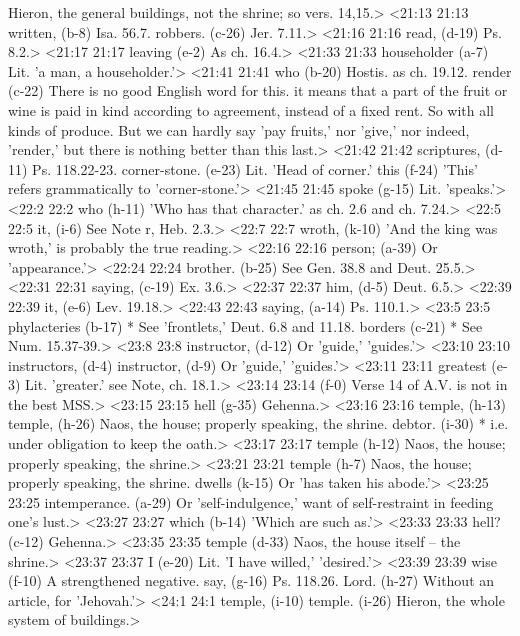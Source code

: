   Hieron, the general buildings, not the shrine; so vers. 14,15.>
<21:13 21:13  written, (b-8)  Isa. 56.7.  robbers. (c-26)  Jer. 7.11.>
<21:16 21:16  read, (d-19)  Ps. 8.2.>
<21:17 21:17  leaving (e-2)  As ch. 16.4.>
<21:33 21:33  householder (a-7)  Lit. 'a man, a householder.'>
<21:41 21:41  who (b-20)  Hostis. as ch. 19.12.
  render (c-22)  There is no good English word for this. it means that a part  of the fruit or wine is paid in kind according to agreement,  instead of a fixed rent. So with all kinds of produce. But we  can hardly say 'pay fruits,' nor 'give,' nor indeed, 'render,'  but there is nothing better than this last.>
<21:42 21:42  scriptures, (d-11)  Ps. 118.22-23.
  corner-stone. (e-23)  Lit. 'Head of corner.'
  this (f-24)  'This' refers grammatically to 'corner-stone.'>
<21:45 21:45  spoke (g-15)  Lit. 'speaks.'>
<22:2 22:2  who (h-11)  'Who has that character.' as ch. 2.6 and ch. 7.24.>
<22:5 22:5  it, (i-6)  See Note r, Heb. 2.3.>
<22:7 22:7  wroth, (k-10)  'And the king was wroth,' is probably the true reading.>
<22:16 22:16  person; (a-39)  Or 'appearance.'>
<22:24 22:24  brother. (b-25)  See Gen. 38.8 and Deut. 25.5.>
<22:31 22:31  saying, (c-19)  Ex. 3.6.>
<22:37 22:37  him, (d-5)  Deut. 6.5.>
<22:39 22:39  it, (e-6)  Lev. 19.18.>
<22:43 22:43  saying, (a-14)  Ps. 110.1.>
<23:5 23:5  phylacteries (b-17)  * See 'frontlets,' Deut. 6.8 and 11.18.
  borders (c-21)  * See Num. 15.37-39.>
<23:8 23:8  instructor, (d-12)  Or 'guide,' 'guides.'>
<23:10 23:10  instructors, (d-4)  instructor, (d-9)
  Or 'guide,' 'guides.'>
<23:11 23:11  greatest (e-3)  Lit. 'greater.' see Note, ch. 18.1.>
<23:14 23:14   (f-0)  Verse 14 of A.V. is not in the best MSS.>
<23:15 23:15  hell (g-35)  Gehenna.>
<23:16 23:16  temple, (h-13)  temple, (h-26)
  Naos, the house; properly speaking, the shrine.
  debtor. (i-30)  * i.e. under obligation to keep the oath.>
<23:17 23:17  temple (h-12)  Naos, the house; properly speaking, the shrine.>
<23:21 23:21  temple (h-7)  Naos, the house; properly speaking, the shrine.
  dwells (k-15)  Or 'has taken his abode.'>
<23:25 23:25  intemperance. (a-29)  Or 'self-indulgence,' want of self-restraint in feeding one's  lust.>
<23:27 23:27  which (b-14)  'Which are such as.'>
<23:33 23:33  hell? (c-12)  Gehenna.>
<23:35 23:35  temple (d-33)  Naos, the house itself -- the shrine.>
<23:37 23:37  I (e-20)  Lit. 'I have willed,' 'desired.'>
<23:39 23:39  wise (f-10)  A strengthened negative.
  say, (g-16)  Ps. 118.26.
  Lord. (h-27)  Without an article, for 'Jehovah.'>
<24:1 24:1  temple, (i-10)  temple. (i-26)
  Hieron, the whole system of buildings.>
